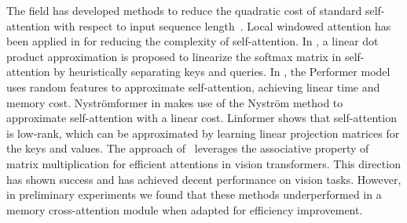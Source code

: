  The field has developed methods to reduce the quadratic cost of standard self-attention with respect to input sequence length~\cite{attention_is_all_you_need}. 
Local windowed attention has been applied in \cite{beltagy2020longformer,zaheer2020bigbird} for reducing the complexity of self-attention. In \cite{shen2018efficient,katharopoulos-et-al-2020}, a linear dot product approximation is proposed to linearize the softmax matrix in self-attention by heuristically separating keys and queries. In \cite{choromanski2020rethinking}, the Performer model uses random features to approximate self-attention, achieving linear time and memory cost. Nystr\"{o}mformer in \cite{xiong2021nystromformer} makes use of the Nystr\"{o}m method to approximate self-attention with a linear cost. Linformer \cite{wang2020linformer} shows that self-attention is low-rank, which can be approximated by learning linear projection matrices for the keys and values. The approach of~\citep{liu2023efficientvit,you2023castling} leverages the associative property of matrix multiplication for efficient attentions in vision transformers. This direction has shown success and has achieved decent performance on vision tasks. However, in preliminary experiments we found that these methods underperformed in a memory cross-attention module when adapted for efficiency improvement.



